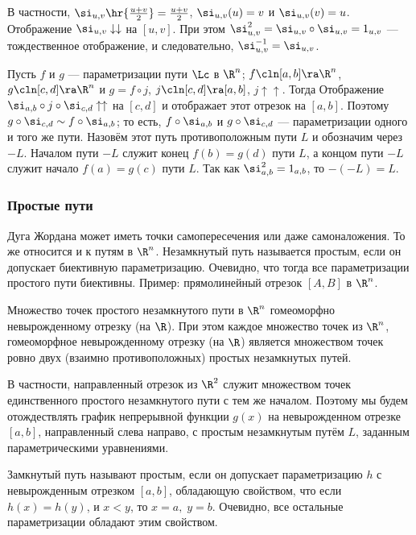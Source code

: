 \documentclass[a4paper]{article}
\begin{document}
В частности, $\si_{u,v} \hr{\frac{u+v}2}=\frac{u+v}2$,
$\si_{u,v}(u)=v$ и $\si_{u,v}(v)=u$. Отображение $\si_{u,v}
\downarrow\downarrow$ на $[u,v]$. При этом $\si^2_{u,v} = \si_{u,v}
\circ \si_{u,v} = 1_{u,v}$ --- тождественное отображение, и
следовательно, $\si_{u,v}^{-1} = \si_{u,v}$.

Пусть $f$ и $g$ --- параметризации пути $\Lc$ в $\R^n$; $f\cln
[a,b]\ra\R^n$, $g\cln[c,d]\ra\R^n$ и $g=f\circ j$,
$j\cln[c,d]\ra[a,b]$, $j\uparrow\uparrow$. Тогда
 Отображение
$\si_{a,b}\circ j\circ\si_{c,d}\uparrow\uparrow$ на $[c,d]$ и
отображает этот отрезок на $[a,b]$. Поэтому $g\circ\si_{c,d} \sim
f\circ\si_{a,b}$; то есть, $f\circ \si_{a,b}$ и $g\circ\si_{c,d}$
--- параметризации одного и того же пути. Назовём этот путь
противоположным пути $L$ и обозначим через $-L$. Началом пути $-L$
служит конец $f(b)=g(d)$ пути $L$, а концом пути $-L$ служит начало
$f(a)=g(c)$ пути $L$. Так как $\si_{a,b}^2=1_{a,b}$, то $-(-L)=L$.

\subsubsection{Простые пути}
Дуга Жордана может иметь точки самопересечения или даже
самоналожения. То же относится и к путям в $\R^n$. Незамкнутый путь
называется простым, если он допускает биективную параметризацию.
Очевидно, что тогда все параметризации простого пути биективны.
Пример: прямолинейный отрезок $[A,B]$ в $\R^n$.

\begin{theorem}
\label{thm131} Множество точек простого незамкнутого пути в $\R^n$
гомеоморфно невырожденному отрезку (на $\R$). При этом каждое
множество точек из $\R^n$, гомеоморфное невырожденному отрезку (на
$\R$) является множеством точек ровно двух (взаимно противоположных)
простых незамкнутых путей.
\end{theorem}

В частности, направленный отрезок из $\R^2$ служит множеством точек
единственного простого незамкнутого пути с тем же началом. Поэтому
мы будем отождествлять график непрерывной функции $g(x)$ на
невырожденном отрезке $[a,b]$, направленный слева направо, с простым
незамкнутым путём $L$, заданным параметрическими уравнениями.

Замкнутый путь называют простым, если он допускает параметризацию
$h$ с невырожденным отрезком $[a,b]$, обладающую свойством, что если
$h(x)=h(y)$, и $x<y$, то $x=a,\;y=b$. Очевидно, все остальные
параметризации обладают этим свойством.
\end{document}
